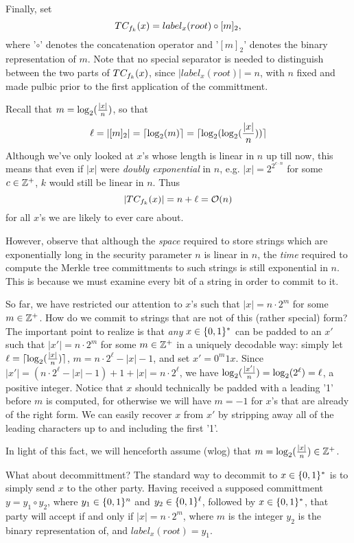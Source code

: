 \documentclass[12pt,twoside]{article}
\begin{document}
Finally, set 
\[
\merk{x}{k} = label_x(root) \circ [m]_2,
\] 
where '$\circ$' denotes the concatenation operator and
'$[m]_2$' denotes the binary representation of $m$. Note that no special 
separator is needed to distinguish between the two parts of $\merk{x}{k}$, 
since $|label_x(root)| = n$, with $n$ fixed and made pulbic
prior to the first application of the committment. 

Recall that $m = \log_2(\overn{x})$, so that 
\[
\ell = |[m]_2| = \ceil{\log_2(m)} = \ceil{\log_2(\log_2(\overn{x}))}
\] 
Although we've only looked at $x$'s whose length is linear in $n$ up till now, 
this means that even if $|x|$ were {\it doubly exponential} in $n$, e.g. 
$|x| = 2^{2^{c\cdot n}}$ for some $c \in \pints$, $k$ would still be linear in 
$n$. Thus 
\[
|\merk{x}{k}| = n + \ell = \fano(n)
\] 
for all $x$'s we are likely to ever care about. 

However, observe that although the {\it space} required to store strings which 
are exponentially long in the security parameter $n$ is linear in $n$, the 
{\it time} required to compute the Merkle tree committments to such strings is 
still exponential in $n$. This is because we must examine every bit of a
string in order to commit to it. 

So far, we have restricted our attention to $x$'s such that $|x| = n\cdot2^m$
for some $m \in \pints$. How do we commit to strings that are not of this 
(rather special) form? The important point to realize is that {\it any} $x 
\in \strs{*}$ can be padded to an $x'$ such that $|x'| = n\cdot2^m$ for some 
$m \in \pints$ in a uniquely decodable way: simply let $\ell = 
\ceil{\log_2(\overn{x})}$, $m = n\cdot2^{\ell} - |x| - 1$, and set 
$x' = 0^m1x$. Since $|x'| = (n\cdot2^{\ell} - |x| - 1) + 1 + |x| =
n\cdot2^{\ell}$, we have $\log_2(\overn{x'}) = \log_2(2^{\ell}) = \ell$,
a positive integer. Notice that $x$ should technically be padded with a
leading '1' before $m$ is computed, for otherwise we will have $m = -1$ for
$x$'s that are already of the right form. We can easily recover $x$ from $x'$ 
by stripping away all of the leading characters up to and including the first 
'1'. 

In light of this fact, we will henceforth assume (wlog) that 
$m = \log_2(\overn{x}) \in \pints$.

What about decommittment? The standard way to decommit to $x \in \strs{*}$ is
to simply send $x$ to the other party. Having received a supposed
committment $y = y_1 \circ y_2$, where $y_1 \in \strs{n}$ and 
$y_2 \in \strs{\ell}$, followed by $x \in \strs{*}$, that party will 
accept if and only if $|x| = n\cdot2^m$, where $m$ is the integer $y_2$ is the 
binary representation of, and $label_x(root) = y_1$. 
\end{document}
